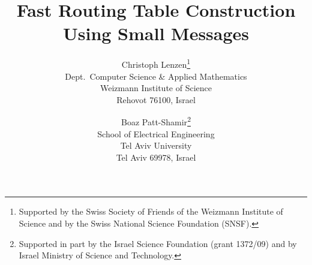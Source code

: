 \documentclass[letterpaper,11pt]{article}
\begin{document}
\setcounter{tocdepth}{3}
\date{}

\title{\textbf{Fast Routing Table Construction Using Small Messages}}

\author{
Christoph Lenzen\thanks{Supported by the Swiss Society of Friends of the Weizmann
Institute of Science and by the Swiss National Science Foundation (SNSF).}
\\
Dept.\ Computer Science \& Applied Mathematics\\
Weizmann Institute of Science\\
Rehovot 76100, Israel
\and
Boaz Patt-Shamir\thanks{Supported in part by the Israel Science
Foundation (grant 1372/09) and by Israel Ministry of Science and
Technology.}
\\
School of Electrical Engineering\\
Tel Aviv University\\
Tel Aviv 69978, Israel
}
\end{document}
